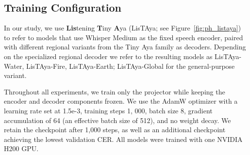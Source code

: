 \documentclass[11pt]{article}
\begin{document}




\subsection{Training Configuration}

In our study, we use \textbf{Lis}tening \textbf{T}iny \textbf{A}ya (LisTAya; see Figure~\ref{fig:ph_listaya}) to refer to models that use Whisper Medium as the fixed speech encoder, paired with different regional variants from the Tiny Aya family as decoders. Depending on the specialized regional decoder we refer to the resulting models as LisTAya-Water, LisTAya-Fire, LisTAya-Earth; LisTAya-Global for the general-purpose variant.

Throughout all experiments, we train only the projector while keeping the encoder and decoder components frozen. We use the AdamW optimizer with a learning rate set at 1.5e-3, training steps 1, 000, batch size 8, gradient accumulation of 64 (an effective batch size of 512), and no weight decay. We retain the checkpoint after 1,000 steps, as well as an additional checkpoint achieving the lowest validation CER. All models were trained with one NVIDIA H200 GPU.
\end{document}

